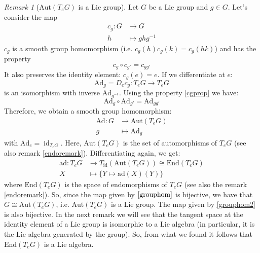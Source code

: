 \documentclass[a4paper,11pt,titlepage, article, oneside]{memoir}
\numberwithin{equation}{section}
\theoremstyle{definition}
\theoremstyle{remark}
\newtheorem{remark}[theorem]{Remark}
\DeclareMathOperator{\id}{id}
\begin{document}
\begin{remarkbox}\begin{remark} [$\text{Aut}(T_e G)$ is a Lie group] \label{autremark}
Let $G$ be a  Lie group and $g \in G$. Let's consider the map
\begin{align} \label{cgmap}
c_g \colon G &\rightarrow G \\
h &\mapsto g h g^{-1} \nonumber
\end{align}
$c_g$ is  a smooth group homomorphism (i.e. $c_g(h)c_g(k)=c_g(hk)$) and has the property
\begin{equation} \label{cgprop}
c_g \circ c_{g'} = c_{g g'}
\end{equation}
 It also preserves the identity element: $c_g(e) = e$. If we differentiate at $e$:
\begin{equation}
\text{Ad}_g = D_e c_g \colon T_e G \rightarrow T_e G
\end{equation}
is an isomorphism with inverse $\text{Ad}_{g^{-1}}$. Using the property \eqref{cgprop} we have:
\begin{equation}
\text{Ad}_g \circ \text{Ad}_{g'} = \text{Ad}_{gg'}
\end{equation}
Therefore, we obtain a smooth group homomorphism:
\begin{align} \label{grouphom}
\text{Ad} \colon G &\rightarrow \text{Aut}(T_e G)  \\
g &\mapsto \text{Ad}_g \nonumber
\end{align}
with $\text{Ad}_e = \id_{T_e G}$. Here, $\text{Aut}(T_e G)$ is the set of automorphisms of $T_e G$ (see also remark \ref{endoremark}).
Differentiating again, we get:
\begin{align} \label{grouphom2}
\text{ad} \colon T_e G &\rightarrow T_{\id} (\text{Aut}(T_e G)) \cong \text{End}(T_e G) \\
X &\mapsto \{ Y \mapsto \text{ad}(X)(Y)\} \nonumber
\end{align}
where $\text{End}(T_e G)$ is the space of endomorphisms of $T_e G$ (see also the remark \eqref{endoremark}).
So, since the map given by $\ref{grouphom}$ is bijective, we have that $G \cong \text{Aut}(T_e G)$, i.e. $\text{Aut}(T_e G)$ is a Lie group.  The map given by \eqref{grouphom2} is also bijective. In the next remark we will see that the tangent space at the identity element of a Lie group is isomorphic to a Lie algebra (in particular, it is the Lie algebra generated by the group). So, from what we found it follows that $\text{End}(T_e G)$ is a Lie algebra.
\end{remark}\end{remarkbox}
\end{document}
